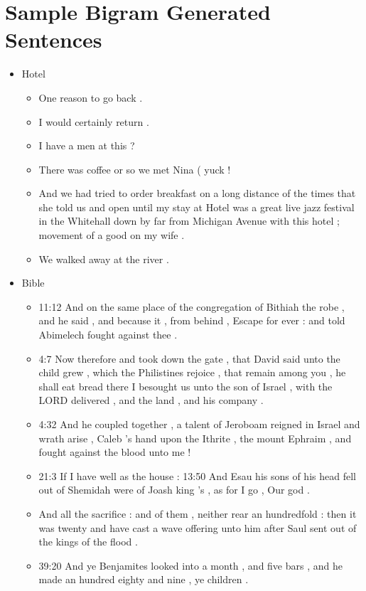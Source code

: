 \documentclass[11pt]{article}
\begin{document}
\section{Sample Bigram Generated Sentences}
\begin{itemize}
    \item Hotel
        \begin{itemize}
            \item One reason to go back .

            \item I would certainly return .

            \item I have a men at this ?

            \item There was coffee or so we met Nina ( yuck !

            \item And we had tried to order breakfast on a long distance of the times that she told us and open until my stay at Hotel was a great live jazz festival in the Whitehall down by far from Michigan Avenue with this                    hotel ; movement of a good on my wife .

            \item We walked away at the river .
        \end{itemize}
    \item Bible
        \begin{itemize}
            \item 11:12 And on the same place of the congregation of Bithiah the robe , and he said , and because it , from behind , Escape for ever : and told Abimelech fought against thee .

            \item 4:7 Now therefore and took down the gate , that David said unto the child grew , which the Philistines rejoice , that remain among you , he shall eat bread there I besought us unto the son of Israel , with the
                      LORD delivered , and the land , and his company .

            \item 4:32 And he coupled together , a talent of Jeroboam reigned in Israel and wrath arise , Caleb 's hand upon the Ithrite , the mount Ephraim , and fought against the blood unto me !

            \item 21:3 If I have well as the house : 13:50 And Esau his sons of his head fell out of Shemidah were of Joash king 's , as for I go , Our god .

            \item And all the sacrifice : and of them , neither rear an hundredfold : then it was twenty and have cast a wave offering unto him after Saul sent out of the kings of the flood .

            \item 39:20 And ye Benjamites looked into a month , and five bars , and he made an hundred eighty and nine , ye children .
        \end{itemize}
\end{itemize}  
\end{document}
